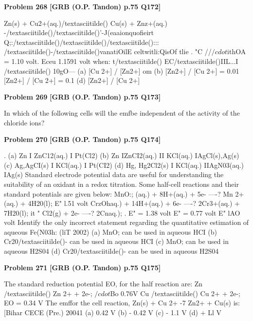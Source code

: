 \begin{problembox}
\textbf{Problem 268} \hfill \textbf{[GRB (O.P. Tandon) p.75 Q172]}
\label{q:ext-grb_all_questions-268}

Zn(s) + Cu2+(aq.)/textasciitilde() Cu(s) + Znz+(aq.) 
-/textasciitilde()/textasciitilde()'-J(eaaionquofieirt Q;:/textasciitilde()/textasciitilde()/textasciitilde()::: /textasciitilde()-/textasciitilde()vanatiOilE celtwitli:QisOf tlie 
. "C //$/cdot$ithOA = 1.10 volt. Eceu 
1.1591 volt when: 
t/textasciitilde() 
EC/textasciitilde()IIL...I \underline{\hspace{1cm}} /textasciitilde() 
\underline{\hspace{1cm}} \underline{\hspace{1cm}} 
10gO---
(a) [Cu 2+] / [Zn2+] om 
(b) [Zn2+] / [Cu 2+] = 0.01 
[Zn2+] / [Cu 2+] = 0.1 
(d) [Zn2+] / [Cu 2+]
\end{problembox}

\begin{problembox}
\textbf{Problem 269} \hfill \textbf{[GRB (O.P. Tandon) p.75 Q173]}
\label{q:ext-grb_all_questions-269}

In which of the following cells will the emfbe independent of 
the activity of the chloride ions?
\end{problembox}

\begin{problembox}
\textbf{Problem 270} \hfill \textbf{[GRB (O.P. Tandon) p.75 Q174]}
\label{q:ext-grb_all_questions-270}

. (a) Zn I ZnC12(aq.) I Pt(Cl2) 
(b) Zn IZnCI2(aq.) II KCl(aq.) IAgCl(s),Ag(s) 
(c) Ag,AgCI(s) I KCl(aq.) I Pt(CI2) 
(d) Hg, Hg2Cl2(s) I KCl(aq.) IIAgN03(aq.) IAg(s) 
Standard electrode potential data are useful for understanding 
the suitability of an oxidant in a redox titration. Some half-cell 
reactions and their standard potentials are given below: 
MnO:; (aq.) + 8H+(aq.) + 5e- ----? Mn 2+(aq.) + 4H20(l); 
E" 
l.51 volt 
CrzOhaq.) + 14H+(aq.) + 6e- ----? 2Cr3+(aq.) + 7H20(l); 
it 
" 
Cl2(g) + 2e- ----? 2Cnaq.); . 
E" = 1.38 volt 
E" = 0.77 volt 
E" 
lAO volt 
Identify the only incorrect statement regarding the quantitative 
estimation of aqueous Fe(N03h: 
(liT 2002) 
(a) MnO; can be used in aqueous HCI 
(b) Cr20/textasciitilde()- can be used in aqueous HCI 
(c) MnO; can be used in aqueous H2S04 
(d) Cr20/textasciitilde()- can be used in aqueous H2S04
\end{problembox}

\begin{problembox}
\textbf{Problem 271} \hfill \textbf{[GRB (O.P. Tandon) p.75 Q175]}
\label{q:ext-grb_all_questions-271}

The standard reduction potential EO, for the half reaction are: 
Zn /textasciitilde() 
Zn 2+ + 2e-; 
$/cdot$Bo 
0.76V 
Cu /textasciitilde() 
Cu 2+ + 2e-; 
EO = 0.34 V 
The emffor the cell reaction, Zn(s) + Cu 2+ -7 Zn2+ + Cu(s) 
is: 
[Bihar CECE (Pre.) 20041 
(a) 0.42 V 
(b) - 0.42 V 
(c) - 1.1 V 
(d) + Ll V
\end{problembox}

